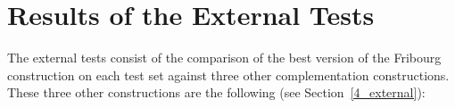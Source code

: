 






\section{Results of the External Tests}
\label{5_external}
The external tests consist of the comparison of the best version of the Fribourg construction on each test set against three other complementation constructions. These three other constructions are the following (see Section~\ref{4_external}):

